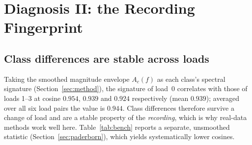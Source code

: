 \documentclass[preprint,12pt]{elsarticle}
\begin{document}
\begin{table}[t]
\centering
\caption{Training only on a synthetic source, testing on the real target load
(load~3, ten classes). Each entry is $20$ runs --- ten seeds, the whole
configuration repeated twice --- and the $\pm$ is the standard deviation over
those $20$ runs. ``Disc.''\ is a domain discriminator
trained on backbone features to separate the synthetic source from real target
data ($0.5$ = indistinguishable). Every synthetic set is drawn with a
randomized resonance frequency ($2850$--$3550$\,Hz), impulse power and harmonic
amplitudes and phases, and with jittered impulse timing, so each row averages
over generator parameters as well as seeds. The two
repetitions of the target-fingerprint row differ by $0.033$ in the mean of ten
seeds, and a single ten-seed draw would understate that row's spread by a
factor of two.}
\label{tab:synth}
\small
{}
\end{table}

\section{Diagnosis II: the Recording Fingerprint}
\label{sec:diag2}

\subsection{Class differences are stable across loads}
Taking the smoothed magnitude envelope $A_c(f)$ as each class's spectral
signature (Section~\ref{sec:method}), the signature of load~0 correlates with
those of loads 1--3 at cosine $0.954$, $0.939$ and $0.924$ respectively (mean
$0.939$); averaged over all six load pairs the value is $0.944$. Class
differences therefore survive a change of load and are a stable property of the
\emph{recording}, which is why real-data methods work well here.
Table~\ref{tab:bench} reports a separate, unsmoothed statistic
(Section~\ref{sec:paderborn}), which yields systematically lower cosines.
\end{document}
